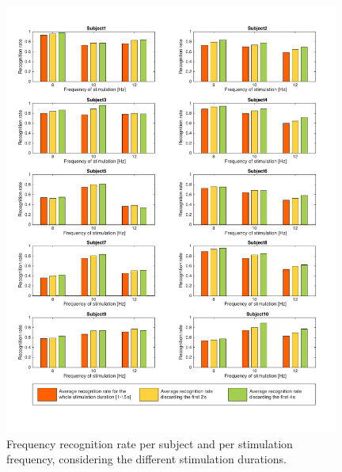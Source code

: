 \documentclass[smallextended]{svjour3}
\begin{document}
\begin{figure}
\center
\includegraphics[width=0.98\textwidth]{figures/all-results-reconn.pdf}
\caption{Frequency recognition rate per subject and per stimulation frequency, considering the different stimulation durations.}
\label{fig:all-results-reconn}
\end{figure}
\end{document}
